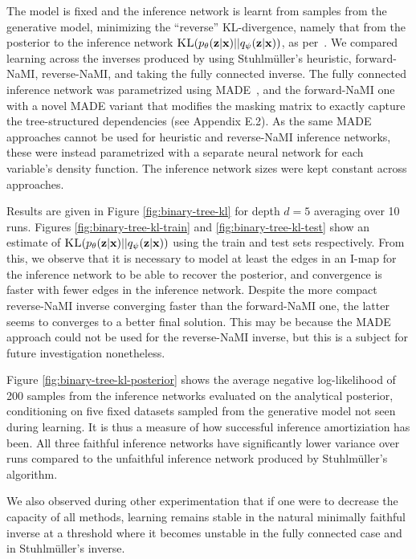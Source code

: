 The model is fixed and the inference network is learnt from samples from the generative model, minimizing the ``reverse'' KL-divergence, namely that from the posterior to the inference network $\textsc{KL}(p_{\theta}(\mathbf{z} | \mathbf{x}) || q_{\psi}(\mathbf{z} | \mathbf{x}))$, as per~\citep{PaigeWood2016}.
We compared learning across the inverses produced by using Stuhlm{\"u}ller's heuristic, forward-NaMI, reverse-NaMI, and taking the fully connected inverse.
The fully connected inference network was parametrized using MADE~\citep{GermainEtAl2015}, and the forward-NaMI one with a novel MADE variant that modifies the masking matrix to exactly capture the tree-structured dependencies (see Appendix E.2). As the same MADE approaches cannot be used for heuristic and reverse-NaMI inference networks, these were instead parametrized with a separate neural network for each variable's density function.
The inference network sizes were kept constant across approaches.

Results are given in Figure \ref{fig:binary-tree-kl} for depth $d=5$ averaging over 10 runs. Figures \ref{fig:binary-tree-kl-train} and \ref{fig:binary-tree-kl-test} show an estimate of $\textsc{KL}(p_{\theta}(\mathbf{z} | \mathbf{x}) || q_{\psi}(\mathbf{z} | \mathbf{x}))$ using the train and test sets respectively. From this, we observe that it is necessary to model at least the edges in an I-map for the inference network to be able to recover the posterior, and convergence is faster with fewer edges in the inference network.
Despite the more compact reverse-NaMI inverse converging faster than the forward-NaMI one, the latter seems to converges to a better final solution.  This may be because the MADE approach could not be used for the reverse-NaMI inverse, but this is a subject for future investigation nonetheless.

Figure \ref{fig:binary-tree-kl-posterior} shows the average negative log-likelihood of 200 samples from the inference networks evaluated on the analytical posterior, conditioning on five fixed datasets sampled from the generative model not seen during learning. It is thus a measure of how successful inference amortiziation has been. All three faithful inference networks have significantly lower variance over runs compared to the unfaithful inference network produced by Stuhlm{\"u}ller's algorithm.

We also observed during other experimentation that if one were to decrease the capacity of all methods, learning remains stable in the natural minimally faithful inverse at a threshold where it becomes unstable in the fully connected case and in Stuhlm{\"u}ller's inverse.

